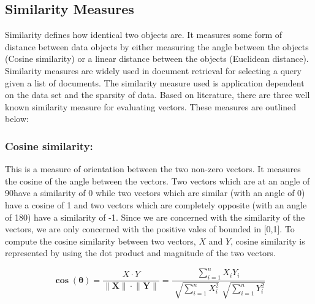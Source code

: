 %
% 
% 

\subsection{Similarity Measures}
Similarity defines how identical two objects are. It measures some form of distance between data objects by either measuring the angle between the objects (Cosine similarity) or a linear distance between the objects (Euclidean distance). Similarity measures are widely used in document retrieval for selecting a query given a list of documents. The similarity measure used is application dependent on the data set and the sparsity of data. Based on literature, there are three well known similarity measure for evaluating vectors. These measures are outlined below:

\subsubsection{Cosine similarity:}

This is a measure of orientation between the two non-zero vectors. It measures the cosine of the angle between the vectors. Two vectors which are at an angle of 90\degree  have a similarity of 0 while two vectors which are similar (with an angle of 0\degree) have a cosine of 1 and two vectors which are completely opposite (with an angle of 180\degree) have a similarity of -1. Since we are concerned with the similarity of the vectors, we are only concerned with the positive vales of bounded in [0,1]. To compute the cosine similarity between two vectors, $X$ and $Y$, cosine similarity is represented by using the dot product and magnitude of the two vectors.

\[\mathbf{\cos{(\theta)}} = \dfrac{X \cdot  Y}{ \lVert \mathbf{X} \rVert \cdot \lVert \mathbf{Y} \rVert} =\dfrac{\sum_{i=1}^n X_i Y_i }{\sqrt[]{\sum_{i=1}^n X_i^2} \sqrt[]{\sum_{i=1}^n Y_i^2}}  \]


